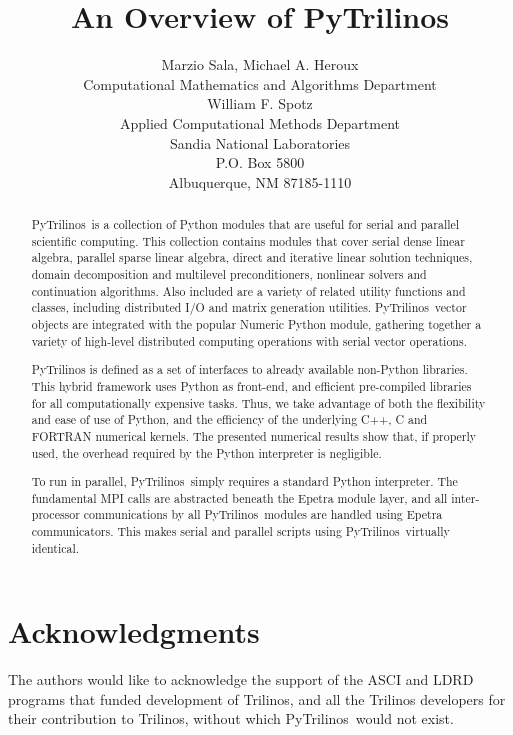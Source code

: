 \documentclass[10pt,relax]{SANDreport}
\author{Marzio Sala, Michael A. Heroux\\
Computational Mathematics and Algorithms Department \\ [10pt]
William F. Spotz
\\
Applied Computational Methods Department \\ [10pt]
Sandia National Laboratories \\
P.O. Box 5800 \\
Albuquerque, NM 87185-1110 \\
}
\title{An Overview of PyTrilinos}
\newcommand{\PyTrilinos}{{PyTrilinos}}
\begin{document}
\maketitle

\begin{abstract}
\PyTrilinos\ is a collection of Python modules that are useful for
serial and parallel scientific computing. This collection contains
modules that cover serial dense linear algebra, parallel sparse
linear algebra, direct and iterative linear solution techniques,
domain decomposition and multilevel preconditioners, nonlinear
solvers and continuation algorithms. Also included are a variety of
related utility functions and classes, including distributed I/O and
matrix generation utilities. \PyTrilinos\ vector objects are
integrated with the popular Numeric Python module, gathering
together a variety of high-level distributed computing operations
with serial vector operations.

PyTrilinos is defined as a set of interfaces to already available
non-Python libraries. This hybrid framework uses Python as
front-end, and efficient pre-compiled libraries for all
computationally expensive tasks. Thus, we take advantage of both the
flexibility and ease of use of Python, and the efficiency of the
underlying C++, C and FORTRAN numerical kernels. The presented
numerical results show that, if properly used, the overhead required
by the Python interpreter is negligible.

To run in parallel, \PyTrilinos\ simply requires a standard Python
interpreter.  The fundamental MPI calls are abstracted beneath the
Epetra module layer, and all inter-processor communications by all
\PyTrilinos\ modules are handled using Epetra communicators. This
makes serial and parallel scripts using \PyTrilinos\ virtually
identical.
\end{abstract}

\clearpage
\section*{Acknowledgments}
The authors would like to acknowledge the support of the ASCI and LDRD
programs that funded development of Trilinos, and all the Trilinos
developers for their contribution to Trilinos, without which
\PyTrilinos\ would not exist.

\medskip

\SANDmain
\tableofcontents
\newpage

\end{document}
